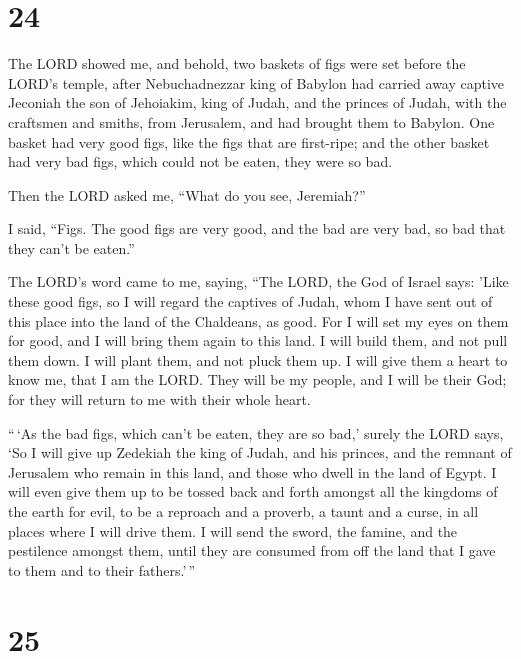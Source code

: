 \hypertarget{section-23}{%
\section{24}\label{section-23}}

 The LORD showed me, and behold, two baskets of figs were
set before the LORD's temple, after Nebuchadnezzar king of Babylon had
carried away captive Jeconiah the son of Jehoiakim, king of Judah, and
the princes of Judah, with the craftsmen and smiths, from Jerusalem, and
had brought them to Babylon.  One basket had very good
figs, like the figs that are first-ripe; and the other basket had very
bad figs, which could not be eaten, they were so bad.

 Then the LORD asked me, ``What do you see, Jeremiah?''

I said, ``Figs. The good figs are very good, and the bad are very bad,
so bad that they can't be eaten.''

 The LORD's word came to me, saying,  ``The
LORD, the God of Israel says: 'Like these good figs, so I will regard
the captives of Judah, whom I have sent out of this place into the land
of the Chaldeans, as good.  For I will set my eyes on them
for good, and I will bring them again to this land. I will build them,
and not pull them down. I will plant them, and not pluck them up.
 I will give them a heart to know me, that I am the LORD.
They will be my people, and I will be their God; for they will return to
me with their whole heart.

 ``\,`As the bad figs, which can't be eaten, they are so
bad,' surely the LORD says, `So I will give up Zedekiah the king of
Judah, and his princes, and the remnant of Jerusalem who remain in this
land, and those who dwell in the land of Egypt.  I will
even give them up to be tossed back and forth amongst all the kingdoms
of the earth for evil, to be a reproach and a proverb, a taunt and a
curse, in all places where I will drive them.  I will
send the sword, the famine, and the pestilence amongst them, until they
are consumed from off the land that I gave to them and to their
fathers.'\,''

\hypertarget{section-24}{%
\section{25}\label{section-24}}

